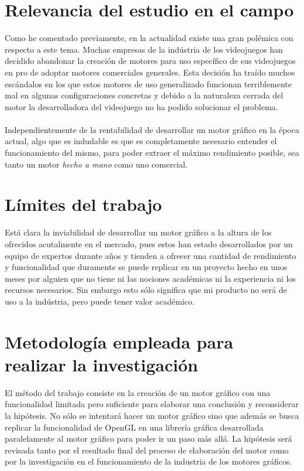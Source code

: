 \documentclass{report}
\begin{document}
\section{Relevancia del estudio en el campo}
Como he comentado previamente, en la actualidad existe una gran polémica con respecto a este tema. Muchas empresas de la indústria de los videojuegos han decidido abandonar la creación de motores para uso específico de sus videojuegos en pro de adoptar motores comerciales generales. Esta decisión ha traído muchos escándalos en los que estos motores de uso generalizado funcionan terriblemente mal en algunas configuraciones concretas y debido a la naturaleza cerrada del motor la desarrolladora del videojuego no ha podido solucionar el problema.
\\\\
Independientemente de la rentabilidad de desarrollar un motor gráfico en la época actual, algo que es indudable es que es completamente necesario entender el funcionamiento del mismo, para poder extraer el máximo rendimiento posible, sea tanto un motor \textit{hecho a mano} como uno comercial.

\section{Límites del trabajo}
Está clara la inviabilidad de desarrollar un motor gráfico a la altura de los ofrecidos acutalmente en el mercado, pues estos han estado desarrollados por un equipo de expertos durante años y tienden a ofrecer una cantidad de rendimiento y funcionalidad que duramente se puede replicar en un proyecto hecho en unos meses por alguien que no tiene ni las nociones académicas ni la experiencia ni los recursos necesarios. Sin embargo esto sólo significa que mi producto no será de uso a la indústria, pero puede tener valor académico.

\section{Metodología empleada para realizar la investigación}
El método del trabajo consiste en la creación de un motor gráfico con una funcionalidad limitada pero suficiente para elaborar una conclusión y reconsiderar la hipótesis. No sólo se intentará hacer un motor gráfico sino que además se busca replicar la funcionalidad de OpenGL en una librería gráfica desarrollada paralelamente al motor gráfico para poder ir un paso más allá. La hipótesis será revisada tanto por el resultado final del proceso de elaboración del motor como por la investigación en el funcionamiento de la industria de los motores gráficos.
\end{document}
